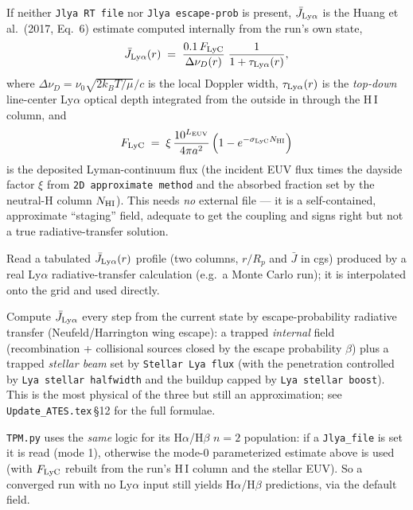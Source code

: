 \documentclass[english,a4paper]{kiseon_memo}
\begin{document}
\begin{description}\itemsep3pt
\item[\textmd{(mode 0) Parameterized --- the default with no external input.}]
  If neither \texttt{Jlya RT file} nor \texttt{Jlya escape-prob} is present,
  $\bar J_{\rm Ly\alpha}$ is the Huang et al.\ (2017, Eq.~6) estimate computed
  internally from the run's own state,
  \[
  \bar J_{\rm Ly\alpha}(r) \;=\; \frac{0.1\,F_{\rm LyC}}{\Delta\nu_D(r)}
        \;\frac{1}{1+\tau_{\rm Ly\alpha}(r)},
  \]
  where $\Delta\nu_D=\nu_0\sqrt{2k_BT/\mu}/c$ is the local Doppler width,
  $\tau_{\rm Ly\alpha}(r)$ is the \emph{top-down} line-center Ly$\alpha$ optical
  depth integrated from the outside in through the H\,I column, and
  \[
  F_{\rm LyC} \;=\; \xi\,\frac{10^{L_{\rm EUV}}}{4\pi a^2}\,
        \Big(1-e^{-\sigma_{\rm LyC} N_{\rm HI}}\Big)
  \]
  is the deposited Lyman-continuum flux (the incident EUV flux times the dayside
  factor $\xi$ from \texttt{2D approximate method} and the absorbed fraction set by
  the neutral-H column $N_{\rm HI}$). This needs \emph{no} external file --- it is a
  self-contained, approximate ``staging'' field, adequate to get the coupling and
  signs right but not a true radiative-transfer solution.
\item[\textmd{(mode 1) External RT file --- \texttt{Jlya RT file: <path>}.}]
  Read a tabulated $\bar J_{\rm Ly\alpha}(r)$ profile (two columns, $r/R_p$ and
  $\bar J$ in cgs) produced by a real Ly$\alpha$ radiative-transfer calculation
  (e.g.\ a Monte Carlo run); it is interpolated onto the grid and used directly.
\item[\textmd{(mode 2) In-line escape probability --- \texttt{Jlya escape-prob: True}.}]
  Compute $\bar J_{\rm Ly\alpha}$ every step from the current state by
  escape-probability radiative transfer (Neufeld/Harrington wing escape): a
  trapped \emph{internal} field (recombination + collisional sources closed by the
  escape probability $\beta$) plus a trapped \emph{stellar beam} set by
  \texttt{Stellar Lya flux} (with the penetration controlled by \texttt{Lya stellar
  halfwidth} and the buildup capped by \texttt{Lya stellar boost}). This is the most
  physical of the three but still an approximation; see
  \texttt{Update\_ATES.tex}\,\S12 for the full formulae.
\end{description}

\noindent
\texttt{TPM.py} uses the \emph{same} logic for its H$\alpha$/H$\beta$ $n{=}2$
population: if a \texttt{Jlya\_file} is set it is read (mode 1), otherwise the
mode-0 parameterized estimate above is used (with $F_{\rm LyC}$ rebuilt from the
run's H\,I column and the stellar EUV). So a converged run with no Ly$\alpha$ input
still yields H$\alpha$/H$\beta$ predictions, via the default field.
\end{document}
